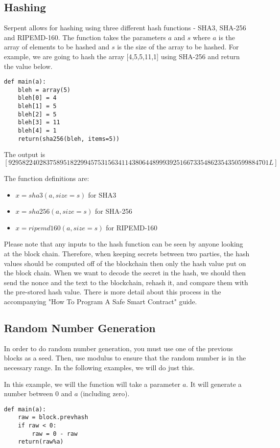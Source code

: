 \documentclass[12pt]{article}
\begin{document}
\subsection{Hashing}
Serpent allows for hashing using three different hash functions - SHA3, SHA-256 and RIPEMD-160. The function takes the parameters $a$ and $s$ where $a$ is the array of elements to be hashed and $s$ is the size of the array to be hashed. For example, we are going to hash the array [4,5,5,11,1] using SHA-256 and return the value below. \cite{Serpent}

\begin{verbatim}
def main(a):
	bleh = array(5)
	bleh[0] = 4
	bleh[1] = 5
	bleh[2] = 5
	bleh[3] = 11
	bleh[4] = 1
	return(sha256(bleh, items=5))
\end{verbatim}
The output is $[9295822402837589518229945753156341143806448999392516673354862354350599884701L]$

The function definitions are:
\begin{itemize}
	\item $x = sha3(a, size=s)$ for SHA3
	\item $x = sha256(a, size=s)$ for SHA-256
	\item $x = ripemd160(a, size=s)$ for RIPEMD-160
\end{itemize}

Please note that any inputs to the hash function can be seen by anyone looking at the block chain. Therefore, when keeping secrets between two parties, the hash values should be computed off of the blockchain then only the hash value put on the block chain. When we want to decode the secret in the hash, we should then send the nonce and the text to the blockchain, rehash it, and compare them with the pre-stored hash value. There is more detail about this process in the accompanying "How To Program A Safe Smart Contract" guide.

\subsection{Random Number Generation}
In order to do random number generation, you must use one of the previous blocks as a seed. Then, use modulus to ensure that the random number is in the necessary range. In the following examples, we will do just this.

In this example, we will the function will take a parameter $a$. It will generate a number between 0 and $a$ (including zero).

\begin{verbatim}
def main(a):
	raw = block.prevhash
	if raw < 0:
		raw = 0 - raw
	return(raw%a)
\end{verbatim}
\end{document}
